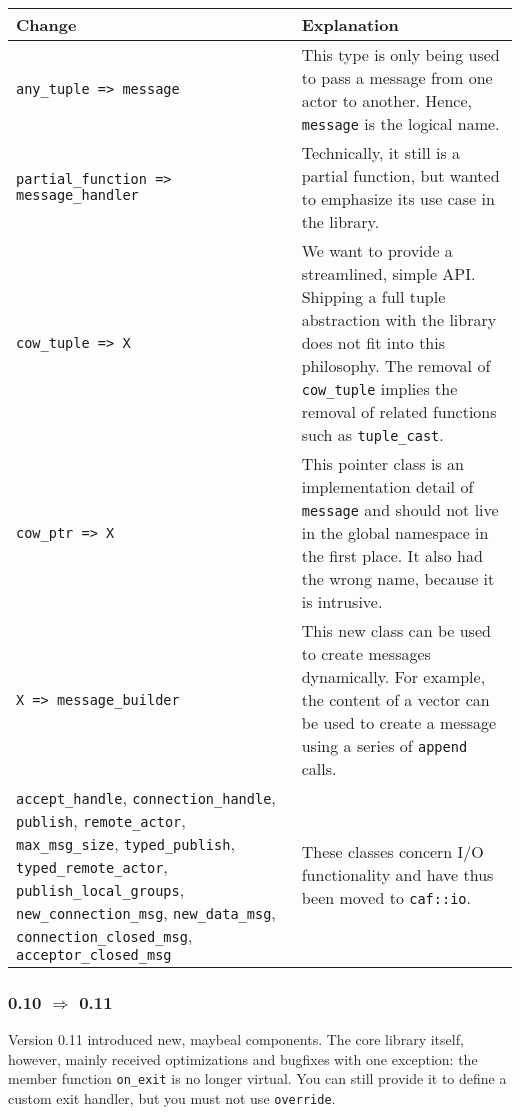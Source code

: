\begin{tabular*}{\textwidth}{m{}m{}}
  Change & Explanation \\
  \hline
  \lstinline^any_tuple => message^ & This type is only being used to pass a message from one actor to another. Hence, \lstinline^message^ is the logical name. \\
  \hline
  \lstinline^partial_function => ^ \lstinline^message_handler^ & Technically, it still is a partial function, but wanted to emphasize its use case in the library. \\
  \hline
  \lstinline^cow_tuple => X^ & We want to provide a streamlined, simple API. Shipping a full tuple abstraction with the library does not fit into this philosophy. The removal of \lstinline^cow_tuple^ implies the removal of related functions such as \lstinline^tuple_cast^. \\
  \hline
  \lstinline^cow_ptr => X^ & This pointer class is an implementation detail of \lstinline^message^ and should not live in the global namespace in the first place. It also had the wrong name, because it is intrusive. \\
  \hline
  \lstinline^X => message_builder^ & This new class can be used to create messages dynamically. For example, the content of a vector can be used to create a message using a series of \lstinline^append^ calls. \\
  \hline
  \lstinline^accept_handle^, \lstinline^connection_handle^, \lstinline^publish^, \lstinline^remote_actor^, \lstinline^max_msg_size^, \lstinline^typed_publish^, \lstinline^typed_remote_actor^, \lstinline^publish_local_groups^, \lstinline^new_connection_msg^, \lstinline^new_data_msg^, \lstinline^connection_closed_msg^, \lstinline^acceptor_closed_msg^ & These classes concern I/O functionality and have thus been moved to \lstinline^caf::io^. \\
  \hline
\end{tabular*}

\subsubsection{0.10 $\Rightarrow$ 0.11}

Version 0.11 introduced new, maybeal components.
The core library itself, however, mainly received optimizations and bugfixes with one exception: the member function \lstinline^on_exit^ is no longer virtual.
You can still provide it to define a custom exit handler, but you must not use \lstinline^override^.

